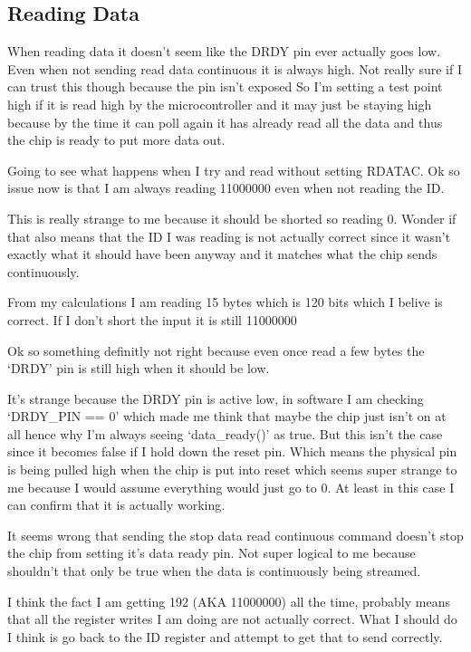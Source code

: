 \subsection{Reading Data}
When reading data it doesn't seem like the DRDY pin ever actually goes low.
Even when not sending read data continuous it is always high.
Not really sure if I can trust this though because the pin isn't exposed
So I'm setting a test point high if it is read high by the microcontroller and it may
just be staying high because by the time it can poll again it has already read all the data
and thus the chip is ready to put more data out.

Going to see what happens when I try and read without setting RDATAC.
Ok so issue now is that I am always reading 11000000 even when not reading the ID.

This is really strange to me because it should be shorted so reading 0.
Wonder if that also means that the ID I was reading is not actually correct since it wasn't
exactly what it should have been anyway and it matches what the chip sends continuously.

From my calculations I am reading 15 bytes which is 120 bits which I belive is correct.
If I don't short the input it is still 11000000

Ok so something definitly not right because even once read a few bytes the `DRDY'
pin is still high when it should be low.

It's strange because the DRDY pin is active low, in software I am checking `DRDY\_PIN == 0'
which made me think that maybe the chip just isn't on at all hence why I'm always seeing
`data\_ready()' as true.
But this isn't the case since it becomes false if I hold down the reset pin.
Which means the physical pin is being pulled high when the chip is put into reset which
seems super strange to me because I would assume everything would just go to 0.
At least in this case I can confirm that it is actually working.

It seems wrong that sending the stop data read continuous command doesn't stop the chip
from setting it's data ready pin. Not super logical to me because shouldn't that only be
true when the data is continuously being streamed.

I think the fact I am getting 192 (AKA 11000000) all the time, probably means that all the
register writes I am doing are not actually correct. What I should do I think is go back
to the ID register and attempt to get that to send correctly.

